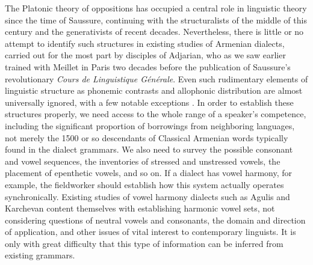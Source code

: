 \documentclass[output=paper]{langscibook}
\begin{document}
The Platonic theory of oppositions has occupied a central role in linguistic theory since the time of Saussure, continuing with the structuralists of the middle of this century and the generativists of recent decades. Nevertheless, there is little or no attempt to identify such structures in existing studies of Armenian dialects, carried out for the most part by disciples of Adjarian, who as we saw earlier trained with Meillet in Paris two decades before the publication of Saussure's revolutionary \textit{Cours de Linguistique Générale}. Even such rudimentary elements of linguistic structure as phonemic contrasts and allophonic distribution are almost universally ignored, with a few notable exceptions \citep{Pisowicz-1969-ParpiArmenian,Haneyan-1978-TikranakertDialect,Khachatryan-1988-ArmenianPhono}. In order to establish these structures properly, we need access to the whole range of a speaker's competence, including the significant proportion of borrowings from neighboring languages, not merely the 1500 or so descendants of Classical Armenian words typically found in the dialect grammars. We also need to survey the possible consonant and vowel sequences, the inventories of stressed and unstressed vowels, the placement of epenthetic vowels, and so on. If a dialect has vowel harmony, for example, the fieldworker should establish how this system actually operates synchronically. Existing studies of vowel harmony dialects such as Agulis and Karchevan content themselves with establishing harmonic vowel sets, not considering questions of neutral vowels and consonants, the domain and direction of application, and other issues of vital interest to contemporary linguists. It is only with great difficulty that this type of information can be inferred from existing grammars.
\end{document}
